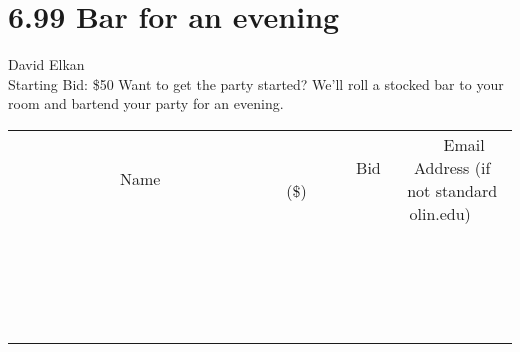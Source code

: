 \documentclass[11pt]{article}
\begin{document}
\section*{6.99 Bar for an evening}
David Elkan
\\
Starting Bid: \$50
\newline
Want to get the party started? We'll roll a stocked bar to your room and bartend your party for an evening.
\\[3ex]
\begin{tabular}{c c c}
~~~~~~~~~~~~~Name~~~~~~~~~~~~~ & ~~~~~~~~~Bid (\$)~~~~~~~~~  & ~~~Email Address (if not standard olin.edu)~~~\\
 & & \\
\hline
 & & \\
\hline
 & & \\
\hline
 & & \\
\hline
 & & \\
\hline
 & & \\
\hline
 & & \\
\hline
 & & \\
\hline
 & & \\
\hline
 & & \\
\hline
 & & \\
\hline
 & & \\
\hline
 & & \\
\hline
 & & \\
\hline
 & & \\
\hline
 & & \\
\hline
 & & \\
\hline
 & & \\
\hline
 & & \\
\hline
\end{tabular}
\newpage
\end{document}
